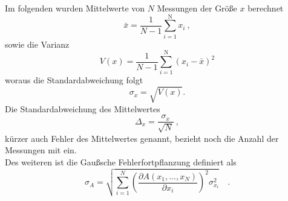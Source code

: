 Im folgenden wurden Mittelwerte von $N$ Messungen der Größe $x$ berechnet
\begin{equation}
\bar{x} =  \frac{1}{N-1} \sum_{i=1}^\text{N} x_i \ ,
\end{equation}
sowie die Varianz
\begin{equation}
V(x) = \frac{1}{N-1} \sum_{i=1}^\text{N} (x_i - \bar{x})^2
\end{equation}
woraus die Standardabweichung folgt
\begin {equation}
\sigma_x = \sqrt{V(x)}.
\end{equation}
Die Standardabweichung des Mittelwertes
\begin{equation}
\Delta_{x} = \frac{\sigma_x}{\sqrt{N}} \ ,
\end{equation}
kürzer auch Fehler des Mittelwertes genannt, bezieht noch die Anzahl der Messungen mit ein. \\
Des weiteren ist die Gaußsche Fehlerfortpflanzung definiert als
\begin{equation}
\sigma_A = \sqrt{ \sum_{i=1}^N  \left(   \frac{\partial A(x_1, ... ,x_N)}{\partial x_i} \right)^2 \sigma_{x_i} ^2 } \quad .
\end{equation}

\clearpage

